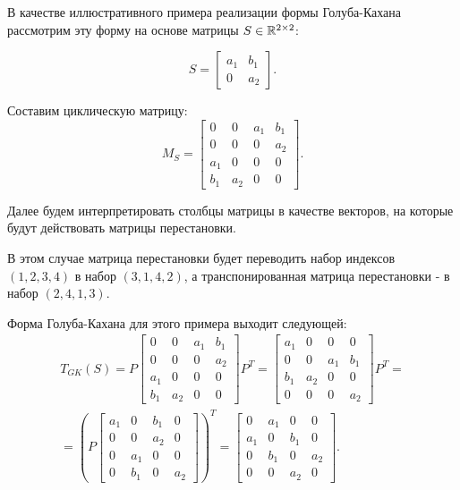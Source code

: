 \begin{example}
    В качестве иллюстративного примера реализации формы Голуба-Кахана рассмотрим эту форму на основе матрицы \(S\in \mathbb{R}^{2 \times 2}\):

\[
    S=\begin{bmatrix} a_1 & b_1 \\ 0 & a_2 \end{bmatrix}.
\]

Составим циклическую матрицу:
\[
    M_S=\begin{bmatrix} 0 & 0& a_1 & b_1 \\ 0 & 0 & 0 & a_2 \\ a_1 & 0 & 0 & 0 \\ b_1 & a_2 & 0 & 0  \end{bmatrix}.
\]

Далее будем интерпретировать столбцы матрицы в качестве векторов, на которые будут действовать матрицы перестановки.

\begin{note}
    В этом случае матрица перестановки будет переводить набор индексов \((1,2,3,4)\) в набор \((3,1,4,2)\), а транспонированная матрица перестановки - в набор \((2,4,1,3)\).
\end{note}

Форма Голуба-Кахана для этого примера выходит следующей:
\begin{equation*}
    \begin{split}
        T_{GK}(S)=P\begin{bmatrix} 0 & 0& a_1 & b_1 \\ 0 & 0 & 0 & a_2 \\ a_1 & 0 & 0 & 0 \\ b_1 & a_2 & 0 & 0  \end{bmatrix}P^T
        =
        \begin{bmatrix} a_1 & 0& 0 & 0 \\ 0 & 0 & a_1 & b_1 \\ b_1 & a_2 & 0 & 0 \\ 0 & 0 & 0 & a_2  \end{bmatrix}P^T=\\[6pt]=\left(P\begin{bmatrix} a_1 & 0& b_1 & 0 \\ 0 & 0 & a_2 & 0 \\ 0 & a_1 & 0 & 0 \\ 0 & b_1 & 0 & a_2  \end{bmatrix}\right)^T= \begin{bmatrix} 0 & a_1 & 0 & 0 \\ a_1 & 0 & b_1 & 0 \\ 0 & b_1 & 0 & a_2 \\ 0 & 0 & a_2 & 0  \end{bmatrix}.
        \end{split} 
    \end{equation*}
\end{example}

